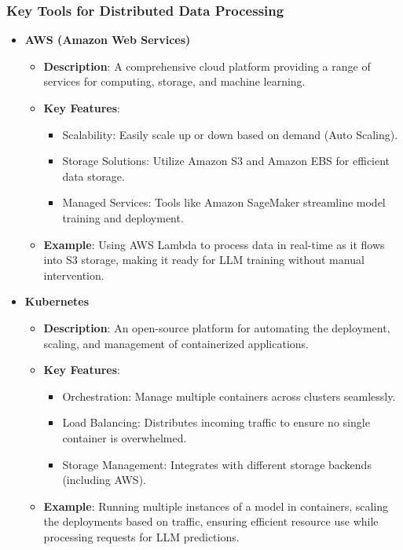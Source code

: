 \documentclass[aspectratio=169]{beamer}
\begin{document}
\begin{frame}[fragile]
    \frametitle{Key Tools for Distributed Data Processing}
    \begin{itemize}
        \item \textbf{AWS (Amazon Web Services)}
        \begin{itemize}
            \item \textbf{Description}: A comprehensive cloud platform providing a range of services for computing, storage, and machine learning.
            \item \textbf{Key Features}:
            \begin{itemize}
                \item Scalability: Easily scale up or down based on demand (Auto Scaling).
                \item Storage Solutions: Utilize Amazon S3 and Amazon EBS for efficient data storage.
                \item Managed Services: Tools like Amazon SageMaker streamline model training and deployment.
            \end{itemize}
            \item \textbf{Example}: Using AWS Lambda to process data in real-time as it flows into S3 storage, making it ready for LLM training without manual intervention.
        \end{itemize}

        \item \textbf{Kubernetes}
        \begin{itemize}
            \item \textbf{Description}: An open-source platform for automating the deployment, scaling, and management of containerized applications.
            \item \textbf{Key Features}:
            \begin{itemize}
                \item Orchestration: Manage multiple containers across clusters seamlessly.
                \item Load Balancing: Distributes incoming traffic to ensure no single container is overwhelmed.
                \item Storage Management: Integrates with different storage backends (including AWS).
            \end{itemize}
            \item \textbf{Example}: Running multiple instances of a model in containers, scaling the deployments based on traffic, ensuring efficient resource use while processing requests for LLM predictions.
        \end{itemize}


\end{itemize}
\end{frame}
\end{document}
